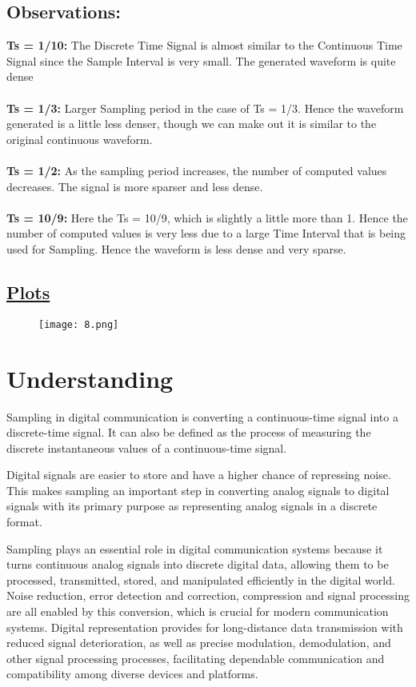 \documentclass[a4paper,12pt,fleqn]{article}
\begin{document}
\subsection*{Observations:}
\textbf{Ts = 1/10:} The Discrete Time Signal is almost similar to the Continuous Time Signal since the Sample Interval is very small. The generated waveform is quite dense
\\ \\
\textbf{Ts = 1/3:} Larger Sampling period in the case of Ts = 1/3. Hence the waveform generated is a little less denser, though we can make out it is similar to the original continuous waveform.
\\ \\
\textbf{Ts = 1/2:} As the sampling period increases, the number of computed values decreases. The signal is more sparser and less dense.
\\ \\
\textbf{Ts = 10/9:} Here the Ts = 10/9, which is slightly a little more than 1. Hence the number of computed values is very less due to a large Time Interval that is being used for Sampling. Hence the waveform is less dense and very sparse.
\\

\newpage
\subsection*{\underline{Plots}}

\begin{figure}[h]
    \centering
    \texttt{[image: 8.png]}
    \label{fig:enter-label}
\end{figure}

\section*{Understanding}
Sampling in digital communication is converting a continuous-time signal into a discrete-time signal. It can also be defined as the process of measuring the discrete instantaneous values of a continuous-time signal.

Digital signals are easier to store and have a higher chance of repressing noise. This makes sampling an important step in converting analog signals to digital signals with its primary purpose as representing analog signals in a discrete format.

Sampling plays an essential role in digital communication systems because it turns continuous analog signals into discrete digital data, allowing them to be processed, transmitted, stored, and manipulated efficiently in the digital world. Noise reduction, error detection and correction, compression and signal processing are all enabled by this conversion, which is crucial for modern communication systems. Digital representation provides for long-distance data transmission with reduced signal deterioration, as well as precise modulation, demodulation, and other signal processing processes, facilitating dependable communication and compatibility among diverse devices and platforms.
\end{document}
